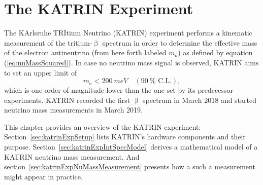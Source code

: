 \chapter{The KATRIN Experiment}
\label{sec:katrin}
The KArlsruhe TRItium Neutrino (KATRIN) experiment performs a kinematic measurement of the tritium-$\upbeta$ spectrum in order to determine the effective mass of the electron antineutrino (from here forth labeled $m_\upnu$) as defined by equation (\ref{eq:nuMassSquared}). In case no neutrino mass signal is observed, KATRIN aims to set an upper limit of
\begin{equation*}
m_\upnu < \SI{200}{meV} \quad (\SI{90}{\percent} \text{ C.L.})
\comma
\end{equation*}
which is one order of magnitude lower than the one set by its predecessor experiments.
KATRIN recorded the first $\upbeta$ spectrum in March 2018 and started neutrino mass measurements in March 2019.

This chapter provides an overview of the KATRIN experiment: Section~\ref{sec:katrinExpSetup} lists KATRIN's hardware components and their purpose. Section~\ref{sec:katrinExpIntSpecModel} derives a mathematical model of a KATRIN neutrino mass measurement. And section~\ref{sec:katrinExpNuMassMeasurement} presents how a such a measurement might appear in practice.




